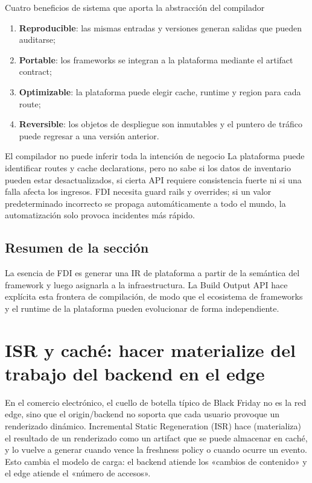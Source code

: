 \documentclass[a4paper]{article}
\begin{document}
\begin{importantbox}{Cuatro beneficios de sistema que aporta la abstracción del compilador}
\begin{enumerate}
  \item \textbf{Reproducible}: las mismas entradas y versiones generan salidas que pueden auditarse;
  \item \textbf{Portable}: los frameworks se integran a la plataforma mediante el artifact contract;
  \item \textbf{Optimizable}: la plataforma puede elegir cache, runtime y region para cada route;
  \item \textbf{Reversible}: los objetos de despliegue son inmutables y el puntero de tráfico puede regresar a una versión anterior.
\end{enumerate}
\end{importantbox}

\begin{warningbox}{El compilador no puede inferir toda la intención de negocio}
La plataforma puede identificar routes y cache declarations, pero no sabe si los datos de inventario pueden estar desactualizados, si cierta API requiere consistencia fuerte ni si una falla afecta los ingresos. FDI necesita guard rails y overrides; si un valor predeterminado incorrecto se propaga automáticamente a todo el mundo, la automatización solo provoca incidentes más rápido.
\end{warningbox}

\subsection{Resumen de la sección}

La esencia de FDI es generar una IR de plataforma a partir de la semántica del framework y luego asignarla a la infraestructura. La Build Output API hace explícita esta frontera de compilación, de modo que el ecosistema de frameworks y el runtime de la plataforma pueden evolucionar de forma independiente.
\section{ISR y caché: hacer materialize del trabajo del backend en el edge}

En el comercio electrónico, el cuello de botella típico de Black Friday no es la red edge, sino que el origin/backend no soporta que cada usuario provoque un renderizado dinámico. Incremental Static Regeneration (ISR) hace  (materializa) el resultado de un renderizado como un artifact que se puede almacenar en caché, y lo vuelve a generar cuando vence la freshness policy o cuando ocurre un evento. Esto cambia el modelo de carga: el backend atiende los «cambios de contenido» y el edge atiende el «número de accesos».
\end{document}
